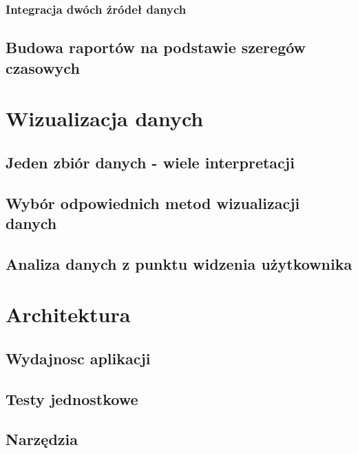 \documentclass[brudnopis]{xmgr}
\begin{document}
        \subsection*{Integracja dwóch źródeł danych}

     \section{Budowa raportów na podstawie szeregów czasowych}

\chapter{Wizualizacja danych}

     \section{Jeden zbiór danych - wiele interpretacji}

     \section{Wybór odpowiednich metod wizualizacji danych}

     \section{Analiza danych z punktu widzenia użytkownika}

\chapter{Architektura}

\section{Wydajnosc aplikacji}

\section{Testy jednostkowe}

\section{Narzędzia}






\listoftables

\listoffigures

\oswiadczenie
\end{document}
